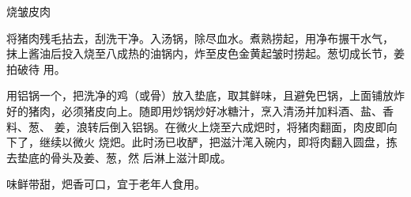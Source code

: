 %
%
%
%
%
%
%
\begin{recipe}{烧皱皮肉}

\ingredients


\preparation

\step 将猪肉残毛拈去，刮洗干净。入汤锅，除尽血水。煮熟捞起，用净布搌干水气，
抹上酱油后投入烧至八成热的油锅内，炸至皮色金黄起皱时捞起。葱切成长节，姜拍破待
用。

\step 用铝锅一个，把洗净的鸡（或骨）放入垫底，取其鲜味，且避免巴锅，上面铺放炸
好的猪肉，必须猪皮向上。随即用炒锅炒好冰糖汁，烹入清汤并加料酒、盐、香料、葱、
姜，浪转后倒入铝锅。在微火上烧至六成𤆵时，将猪肉翻面，肉皮即向下了，继续以微火
烧𤆵。此时汤已收酽，把滋汁滗入碗内，即将肉翻入圆盘，拣去垫底的骨头及姜、葱，然
后淋上滋汁即成。

\features

味鲜带甜，𤆵香可口，宜于老年人食用。

\end{recipe}


